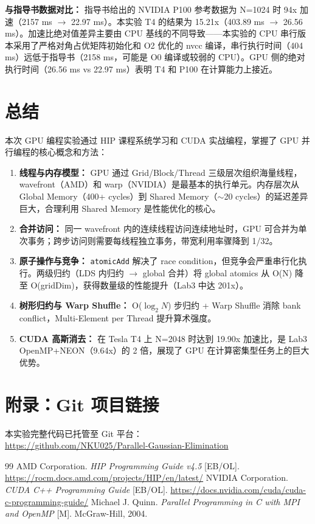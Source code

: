 \documentclass[a4paper]{article}
\begin{document}
\textbf{与指导书数据对比：} 指导书给出的 NVIDIA P100 参考数据为 N=1024 时 94x 加速（2157 ms $\rightarrow$ 22.97 ms）。本实验 T4 的结果为 15.21x（403.89 ms $\rightarrow$ 26.56 ms）。加速比绝对值差异主要由 CPU 基线的不同导致——本实验的 CPU 串行版本采用了严格对角占优矩阵初始化和 O2 优化的 nvcc 编译，串行执行时间（404 ms）远低于指导书（2158 ms，可能是 O0 编译或较弱的 CPU）。GPU 侧的绝对执行时间（26.56 ms vs 22.97 ms）表明 T4 和 P100 在计算能力上接近。

\section{总结}

本次 GPU 编程实验通过 HIP 课程系统学习和 CUDA 实战编程，掌握了 GPU 并行编程的核心概念和方法：

\begin{enumerate}
    \item \textbf{线程与内存模型：} GPU 通过 Grid/Block/Thread 三级层次组织海量线程，wavefront（AMD）和 warp（NVIDIA）是最基本的执行单元。内存层次从 Global Memory（400+ cycles）到 Shared Memory（$\sim$20 cycles）的延迟差异巨大，合理利用 Shared Memory 是性能优化的核心。
    \item \textbf{合并访问：} 同一 wavefront 内的连续线程访问连续地址时，GPU 可合并为单次事务；跨步访问则需要每线程独立事务，带宽利用率骤降到 1/32。
    \item \textbf{原子操作与竞争：} \texttt{atomicAdd} 解决了 race condition，但竞争会严重串行化执行。两级归约（LDS 内归约 $\rightarrow$ global 合并）将 global atomics 从 O(N) 降至 O(gridDim)，获得数量级的性能提升（Lab3 中达 201x）。
    \item \textbf{树形归约与 Warp Shuffle：} O($\log_2 N$) 步归约 + Warp Shuffle 消除 bank conflict，Multi-Element per Thread 提升算术强度。
    \item \textbf{CUDA 高斯消去：} 在 Tesla T4 上 N=2048 时达到 19.90x 加速比，是 Lab3 OpenMP+NEON（9.64x）的 2 倍，展现了 GPU 在计算密集型任务上的巨大优势。
\end{enumerate}

\newpage
\section*{附录：Git 项目链接}
本实验完整代码已托管至 Git 平台：\\
\url{https://github.com/NKU025/Parallel-Gaussian-Elimination}

\renewcommand{\refname}{参考文献}
\begin{thebibliography}{99}
 AMD Corporation. \textit{HIP Programming Guide v4.5} [EB/OL]. \url{https://rocm.docs.amd.com/projects/HIP/en/latest/}
 NVIDIA Corporation. \textit{CUDA C++ Programming Guide} [EB/OL]. \url{https://docs.nvidia.com/cuda/cuda-c-programming-guide/}
 Michael J. Quinn. \textit{Parallel Programming in C with MPI and OpenMP} [M]. McGraw-Hill, 2004.
\end{thebibliography}
\end{document}
